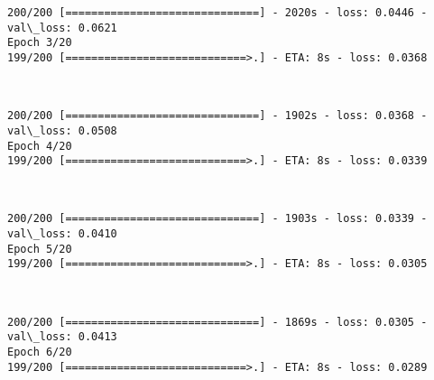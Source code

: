 \documentclass[11pt]{article}
\begin{document}
    \begin{Verbatim}[commandchars=\\\{\}]
200/200 [==============================] - 2020s - loss: 0.0446 - val\_loss: 0.0621
Epoch 3/20
199/200 [============================>.] - ETA: 8s - loss: 0.0368 
    \end{Verbatim}

    \begin{center}
    \end{center}
    { \hspace*{\fill} \\}
    
    \begin{Verbatim}[commandchars=\\\{\}]
200/200 [==============================] - 1902s - loss: 0.0368 - val\_loss: 0.0508
Epoch 4/20
199/200 [============================>.] - ETA: 8s - loss: 0.0339 
    \end{Verbatim}

    \begin{center}
    \end{center}
    { \hspace*{\fill} \\}
    
    \begin{Verbatim}[commandchars=\\\{\}]
200/200 [==============================] - 1903s - loss: 0.0339 - val\_loss: 0.0410
Epoch 5/20
199/200 [============================>.] - ETA: 8s - loss: 0.0305 
    \end{Verbatim}

    \begin{center}
    \end{center}
    { \hspace*{\fill} \\}
    
    \begin{Verbatim}[commandchars=\\\{\}]
200/200 [==============================] - 1869s - loss: 0.0305 - val\_loss: 0.0413
Epoch 6/20
199/200 [============================>.] - ETA: 8s - loss: 0.0289 
    \end{Verbatim}

    \begin{center}
    \end{center}
    { \hspace*{\fill} \\}
    
\end{document}
